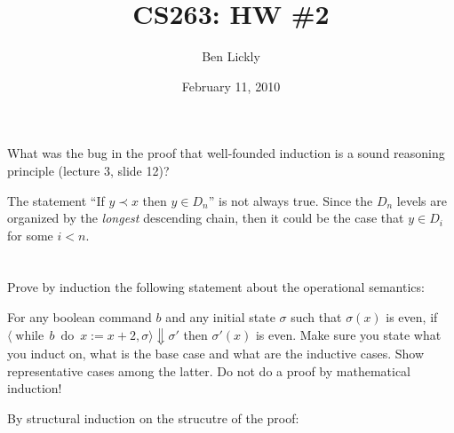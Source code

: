 \documentclass{article}
\title{CS263: HW \#2}
\author{Ben Lickly}
\date{February 11, 2010}
\newcommand{\problem}[1]
{\subsubsection*{} %
\vspace{-16pt} \section{} \vspace{-22pt} \qquad
#1%
\bigskip \bigskip
}
\begin{document}
\maketitle
\problem{
What was the bug in the proof that well-founded induction is a sound
reasoning principle (lecture 3, slide 12)?
}

  The statement ``If $y \prec x$ then $y \in D_n$'' is not always true. Since the
  $D_n$ levels are organized by the \emph{longest} descending chain, then it
  could be the case that $y \in D_i$ for some $i < n$.
  
\problem{
Prove by induction the following statement about the operational semantics:

\newcommand{\while}[2]{\operatorname{while}\, #1\ \operatorname{do}\ #2}

For any boolean command $b$ and any initial state $\sigma$ such that $\sigma(x)$
is even, if $\langle \while{b}{x := x + 2}, \sigma \rangle \Downarrow \sigma'$
then $\sigma'(x)$ is even. Make sure you state what you induct on, what is the
base case and what are the inductive cases. Show representative cases among
the latter. Do not do a proof by mathematical induction!
}

By structural induction on the strucutre of the proof:
\end{document}
